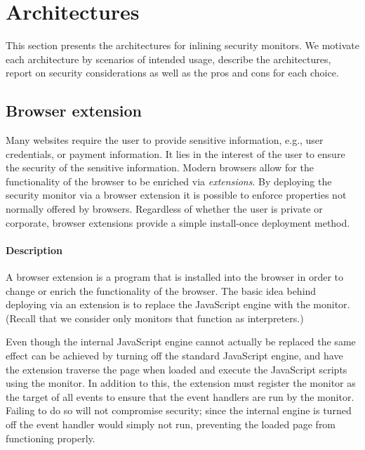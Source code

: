 \documentclass{llncs}
\begin{document}


\section{Architectures}
\label{sec:arch}

This section presents the architectures for inlining
security monitors. We motivate each architecture by scenarios of
intended usage, describe the architectures, report on
security considerations as well as the pros and cons for each choice.




\subsection{Browser extension}

Many websites require the user to provide sensitive information, e.g., user
credentials, or payment information. It lies in the interest of the user to
ensure the security of the sensitive information.  Modern browsers allow for
the functionality of the browser to be enriched via \emph{extensions}. By
deploying the security monitor via a browser extension it is possible to enforce
properties not normally offered by browsers.  Regardless of whether the user is
private or corporate, browser extensions provide a simple 
install-once deployment method.


\paragraph{Description}

A browser extension is a program that is installed into the browser in order to
change or enrich the functionality of the browser.  The basic idea behind
deploying via an extension is to replace the JavaScript engine with the monitor.
(Recall that we consider only monitors that function as interpreters.)

Even though the internal JavaScript engine cannot actually be replaced the same
effect can be achieved by turning off the standard JavaScript engine, and have
the extension traverse the page when loaded and execute the JavaScript scripts
using the monitor. 
In addition to this, the extension must register the monitor as the target of
all events to ensure that the event handlers are run by the monitor. Failing to
do so will not compromise security; since the internal engine is turned off
the event handler would simply not run, preventing the loaded page from functioning
properly.
\end{document}
